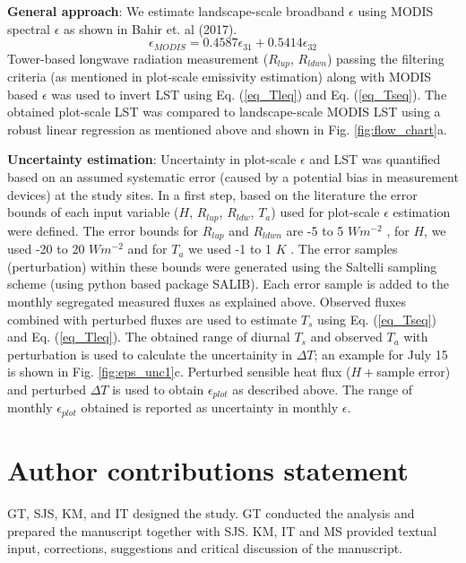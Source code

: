 \documentclass[fleqn,10pt]{wlscirep}
\begin{document}
\textbf{General approach}:
We estimate landscape-scale broadband $\epsilon$ using MODIS spectral $\epsilon$ as shown in Bahir et. al (2017)\cite{bahir2017evaluation}.
\begin{equation}\label{eq_emodis}
\epsilon_{MODIS}= 0.4587 \epsilon_{31} + 0.5414 \epsilon_{32}
\end{equation}
Tower-based longwave radiation measurement ($R_{lup}$, $R_{ldwn}$) passing the filtering criteria (as mentioned in plot-scale emissivity estimation) along with MODIS based $\epsilon$ was used to invert LST using Eq. (\ref{eq_Tleq}) and  Eq. (\ref{eq_Tseq}). The obtained plot-scale LST was compared to landscape-scale MODIS LST using a robust linear regression as mentioned above and shown in Fig. \ref{fig:flow_chart}a.

\textbf{Uncertainty estimation}:
Uncertainty in plot-scale $\epsilon$ and LST was quantified based on an assumed systematic error (caused by a potential bias in measurement devices) at the study sites. In a first step, based on the literature \cite{trenberth2012tracking,foken2008energy} the error bounds of each input variable ($ H$, $R_{lup}$, $R_{ldw}$, $T_{a}$) used for plot-scale $\epsilon$ estimation were defined. The error bounds for $R_{lup}$ and $R_{ldwn}$ are -5 to 5 $Wm^{-2}$ \cite{trenberth2012tracking}, for $H$, we used -20 to 20 $Wm^{-2}$ and for $T_{a}$ we used -1 to 1 $K$ \cite{foken2008energy}. The error samples (perturbation) within these bounds were generated using the Saltelli sampling scheme (using python based package SALIB\cite{saltelli2017new}). Each error sample is added to the monthly segregated measured fluxes as explained above. Observed fluxes combined with perturbed fluxes are used to estimate $T_{s}$ using Eq. (\ref{eq_Tseq}) and  Eq. (\ref{eq_Tleq}). The obtained range of diurnal $T_{s}$ and observed $T_{a}$ with perturbation is used to calculate the uncertainity in $\Delta T$; an example for July 15 is shown in Fig. \ref{fig:eps_unc1}c. Perturbed sensible heat flux ($H + $sample error) and perturbed $\Delta T$ is used to obtain $\epsilon_{plot}$ as described above. The range of monthly $\epsilon_{plot}$ obtained is reported as uncertainty in monthly $\epsilon$. 
\section{Author contributions statement}
GT, SJS, KM, and IT designed the study. GT conducted the analysis and prepared the manuscript together with SJS. KM, IT and MS provided textual input, corrections, suggestions and critical discussion of the manuscript.
\end{document}
